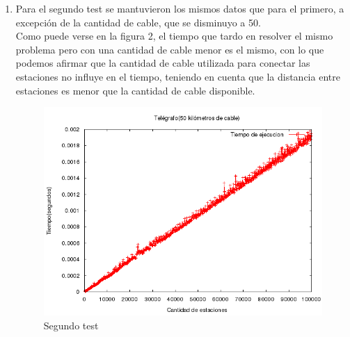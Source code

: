 \documentclass[10pt, a4paper]{article}
\begin{document}
\begin{enumerate}
	\item Para el segundo test se mantuvieron los mismos datos que para el primero, a excepci\'on de la cantidad de cable, que se disminuyo a 50.\\ Como puede verse en la figura 2, el tiempo que tardo en resolver el mismo problema pero con una cantidad de cable menor es el mismo, con lo que podemos afirmar que la cantidad de cable utilizada para conectar las estaciones no influye en el tiempo, teniendo en cuenta que la distancia entre estaciones es menor que la cantidad de cable disponible.\\
	\begin{figure}[H]
  		\centering
   	 	\includegraphics[width=1\textwidth]
   	 	{Imagenes/telegrafoTiempos2.png}
		\caption{Segundo test}
	\end{figure}
	

\end{enumerate}
\end{document}
